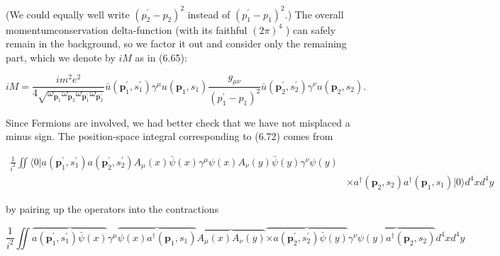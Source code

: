 \documentclass[10pt, letterpaper]{article}
\begin{document}
(We could equally well write $\left(p_{2}^{\prime}-p_{2}\right)^{2}$ instead of $\left(p_{1}^{\prime}-p_{1}\right)^{2}$.) The overall momentumconservation delta-function (with its faithful $(2 \pi)^{4}$ ) can safely remain in the background, so we factor it out and consider only the remaining part, which we denote by $i M$ as in (6.65):

$$
i M=\frac{i m^{2} e^{2}}{4 \sqrt{\omega_{\mathbf{p}_{1}} \omega_{\mathbf{p}_{2}} \omega_{\mathbf{p}_{1}^{\prime}} \omega_{\mathbf{p}_{2}^{\prime}}}} \bar{u}\left(\mathbf{p}_{1}^{\prime}, s_{1}^{\prime}\right) \gamma^{\mu} u\left(\mathbf{p}_{1}, s_{1}\right) \frac{g_{\mu \nu}}{\left(p_{1}^{\prime}-p_{1}\right)^{2}} \bar{u}\left(\mathbf{p}_{2}^{\prime}, s_{2}^{\prime}\right) \gamma^{\nu} u\left(\mathbf{p}_{2}, s_{2}\right) .
$$

Since Fermions are involved, we had better check that we have not misplaced a minus sign. The position-space integral corresponding to (6.72) comes from

$$
\begin{aligned}
\frac{1}{i^{2}} \iint\langle 0| a\left(\mathbf{p}_{1}^{\prime}, s_{1}^{\prime}\right) a\left(\mathbf{p}_{2}^{\prime}, s_{2}^{\prime}\right) A_{\mu}(x) \bar{\psi}(x) \gamma^{\mu} \psi(x) A_{\nu}(y) \bar{\psi}(y) \gamma^{\nu} \psi(y) & \\
& \times a^{\dagger}\left(\mathbf{p}_{2}, s_{2}\right) a^{\dagger}\left(\mathbf{p}_{1}, s_{1}\right)|0\rangle d^{4} x d^{4} y
\end{aligned}
$$

by pairing up the operators into the contractions

$$
\frac{1}{i^{2}} \iint \overbrace{a\left(\mathbf{p}_{1}^{\prime}, s_{1}^{\prime}\right) \bar{\psi}(x)} \gamma^{\mu} \overbrace{\psi(x) a^{\dagger}\left(\mathbf{p}_{1}, s_{1}\right)} \overbrace{A_{\mu}(x) A_{\nu}(y)} \overbrace{\times a\left(\mathbf{p}_{2}^{\prime}, s_{2}^{\prime}\right) \bar{\psi}(y)} \gamma^{\nu} \overbrace{\psi(y) a^{\dagger}\left(\mathbf{p}_{2}, s_{2}\right)} d^{4} x d^{4} y
$$
\end{document}

